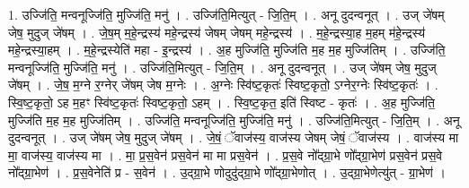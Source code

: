 \documentclass[17pt]{extarticle}
\begin{document}
1. उज्जि॑ति॒ मन्वनूज्जि॑ति॒ मुज्जि॑ति॒ मनु॑ । . उज्जि॑ति॒मित्युत् - जि॒ति॒म् । . अनू दुदन्वनूत् । . उज् जे॑षम् जेष॒ मुदुज् जे॑षम् । . जे॒ष॒म् म॒हे॒न्द्रस्य॑ महे॒न्द्रस्य॑ जेषम् जेषम् महे॒न्द्रस्य॑ । . म॒हे॒न्द्रस्या॒ह म॒हम् म॑हे॒न्द्रस्य॑ महे॒न्द्रस्या॒हम् । . म॒हे॒न्द्रस्येति॑ महा - इ॒न्द्रस्य॑ । . अ॒ह मुज्जि॑ति॒ मुज्जि॑ति म॒ह म॒ह मुज्जि॑तिम् । . उज्जि॑ति॒ मन्वनूज्जि॑ति॒ मुज्जि॑ति॒ मनु॑ । . उज्जि॑ति॒मित्युत् - जि॒ति॒म् । . अनू दुदन्वनूत् । . उज् जे॑षम् जेष॒ मुदुज् जे॑षम् । . जे॒ष॒ म॒ग्ने र॒ग्नेर् जे॑षम् जेष म॒ग्नेः । . अ॒ग्नेः स्वि॑ष्ट॒कृतः॑ स्विष्ट॒कृतो॒ ऽग्नेर॒ग्नेः स्वि॑ष्ट॒कृतः॑ । . स्वि॒ष्ट॒कृतो॒ ऽह म॒हꣳ स्वि॑ष्ट॒कृतः॑ स्विष्ट॒कृतो॒ ऽहम् । . स्वि॒ष्ट॒कृत॒ इति॑ स्विष्ट - कृतः॑ । . अ॒ह मुज्जि॑ति॒ मुज्जि॑ति म॒ह म॒ह मुज्जि॑तिम् । . उज्जि॑ति॒ मन्वनूज्जि॑ति॒ मुज्जि॑ति॒ मनु॑ । . उज्जि॑ति॒मित्युत् - जि॒ति॒म् । . अनू दुदन्वनूत् । . उज् जे॑षम् जेष॒ मुदुज् जे॑षम् । . जे॒षं॒ ॅवाज॑स्य॒ वाज॑स्य जेषम् जेषं॒ ॅवाज॑स्य । . वाज॑स्य मा मा॒ वाज॑स्य॒ वाज॑स्य मा । . मा॒ प्र॒स॒वेन॑ प्रस॒वेन॑ मा मा प्रस॒वेन॑ । . प्र॒स॒वे नो᳚द्ग्रा॒भे णो᳚द्ग्रा॒भेण॑ प्रस॒वेन॑ प्रस॒वे नो᳚द्ग्रा॒भेण॑ । . प्र॒स॒वेनेति॑ प्र - स॒वेन॑ । . उ॒द्ग्रा॒भे णोदुदु॑द्ग्रा॒भे णो᳚द्ग्रा॒भेणोत् । . उ॒द्ग्रा॒भेणेत्यु॑त् - ग्रा॒भेण॑ । \newline
\end{document}
